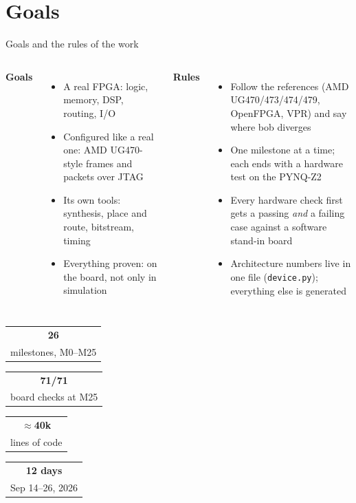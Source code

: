 \documentclass[aspectratio=169,11pt]{beamer}
\makeatletter
\newcommand{\kpi}[2]{\begin{tabular}{@{}c@{}}{\Large\bfseries\color{bobteal}#1}\\[-2pt]{\scriptsize\color{bobmute}#2}\end{tabular}}
\makeatother
\begin{document}
\section{Goals}
\begin{frame}{Goals and the rules of the work}
  \begin{columns}[T]
    \textbf{Goals}
    \begin{itemize}
      \item A \alert{real} FPGA: logic, memory, DSP, routing, I/O
      \item Configured like a real one: AMD UG470-style frames and packets over JTAG
      \item Its own tools: synthesis, place and route, bitstream, timing
      \item Everything proven: on the board, not only in simulation
    \end{itemize}
    \textbf{Rules}
    \begin{itemize}
      \item Follow the references (AMD UG470/473/474/479, OpenFPGA, VPR) and say where bob diverges
      \item One milestone at a time; each ends with a \alert{hardware test} on the PYNQ-Z2
      \item Every hardware check first gets a passing \emph{and} a failing case against a software stand-in board
      \item Architecture numbers live in one file (\texttt{device.py}); everything else is generated
    \end{itemize}
  \end{columns}
  \vspace{3mm}
  \centering
  \kpi{26}{milestones, M0--M25}\qquad
  \kpi{71/71}{board checks at M25}\qquad
  \kpi{$\approx$40k}{lines of code}\qquad
  \kpi{12 days}{Sep 14--26, 2026}
\end{frame}

\end{document}
